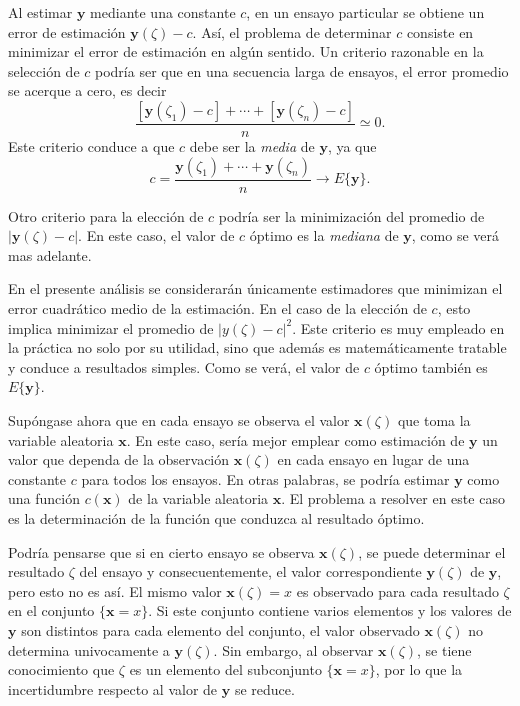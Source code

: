 \documentclass[a4paper]{report}
\newcommand{\x}{\mathbf{x}}
\newcommand{\y}{\mathbf{y}}
\begin{document}
Al estimar \(\y\) mediante una constante \(c\), en un ensayo particular se obtiene un error de estimación \(\y(\zeta)-c\). Así, el problema de determinar \(c\) consiste en minimizar el error de estimación en algún sentido. Un criterio razonable en la selección de \(c\) podría ser que en una secuencia larga de ensayos, el error promedio se acerque a cero, es decir
\[
 \frac{[\y(\zeta_1)-c]+\cdots+[\y(\zeta_n)-c]}{n}\simeq0.
\]
Este criterio conduce a que \(c\) debe ser la \emph{media} de \(\y\), ya que
\[
 c=\frac{\y(\zeta_1)+\cdots+\y(\zeta_n)}{n}\to E\{\y\}.
\]

Otro criterio para la elección de \(c\) podría ser la minimización del promedio de \(|\y(\zeta)-c|\). En este caso, el valor de \(c\) óptimo es la \emph{mediana} de \(\y\), como se verá mas adelante.

En el presente análisis se considerarán únicamente estimadores que minimizan el error cuadrático medio de la estimación. En el caso de la elección de \(c\), esto implica minimizar el promedio de \(|y(\zeta)-c|^2\). Este criterio es muy empleado en la práctica no solo por su utilidad, sino que además es matemáticamente tratable y conduce a resultados simples. Como se verá, el valor de \(c\) óptimo también es \(E\{\y\}\).

Supóngase ahora que en cada ensayo se observa el valor \(\x(\zeta)\) que toma la variable aleatoria \(\x\). En este caso, sería mejor emplear como estimación de \(\y\) un valor que dependa de la observación \(\x(\zeta)\) en cada ensayo en lugar de una constante \(c\) para todos los ensayos. En otras palabras, se podría estimar \(\y\) como una función \(c(\x)\) de la variable aleatoria \(\x\). El problema a resolver en este caso es la determinación de la función que conduzca al resultado óptimo.

Podría pensarse que si en cierto ensayo se observa \(\x(\zeta)\), se puede determinar el resultado \(\zeta\) del ensayo y consecuentemente, el valor correspondiente \(\y(\zeta)\) de \(\y\), pero esto no es así. El mismo valor \(\x(\zeta)=x\) es observado para cada resultado \(\zeta\) en el conjunto \(\{\x=x\}\). Si este conjunto contiene varios elementos y los valores de \(\y\) son distintos para cada elemento del conjunto, el valor observado \(\x(\zeta)\) no determina univocamente a \(\y(\zeta)\). Sin embargo, al observar \(\x(\zeta)\), se tiene conocimiento que \(\zeta\) es un elemento del subconjunto \(\{\x=x\}\), por lo que la incertidumbre respecto al valor de \(\y\) se reduce.
\end{document}
